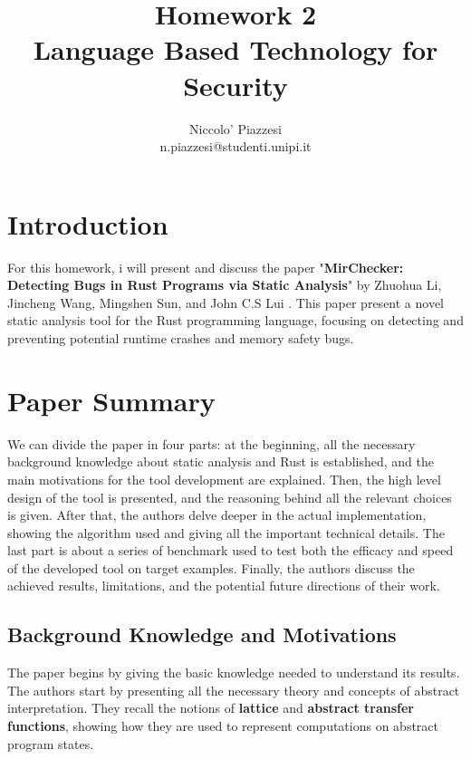 \documentclass{article}
\title{Homework 2 \\ Language Based Technology for Security}
\author{Niccolo' Piazzesi \\ n.piazzesi@studenti.unipi.it}
\begin{document}
\maketitle

\section*{Introduction}
For this homework, i will present and discuss the paper "\textbf{MirChecker: Detecting Bugs in Rust Programs via Static Analysis}" by 
Zhuohua Li, Jincheng Wang, Mingshen Sun, and John C.S Lui \cite{li2021mirchecker}. This paper present a novel static analysis tool for the Rust programming language, 
focusing on detecting and preventing potential runtime crashes and memory safety bugs.
\section*{Paper Summary}
We can divide the paper in four parts: at the beginning, all the necessary background knowledge about static analysis and Rust 
is established, and the main motivations for the tool development are explained. Then, the high level design of the tool is presented, and the reasoning behind all the relevant choices is 
given. After that, the authors delve deeper in the actual implementation, showing the algorithm used and giving all the important technical details. The last part is about a series of benchmark used to 
test both the efficacy and speed of the developed tool on target examples. Finally, the authors discuss the achieved results, limitations, and the potential future directions of their work.
\subsection*{Background Knowledge and Motivations}
The paper begins by giving the basic knowledge needed to understand its results. The authors start by presenting all the necessary  theory and concepts of abstract interpretation. 
They recall the notions of \textbf{lattice} and \textbf{abstract transfer functions}, showing how they are  used to represent computations on abstract program states. 
\end{document}
